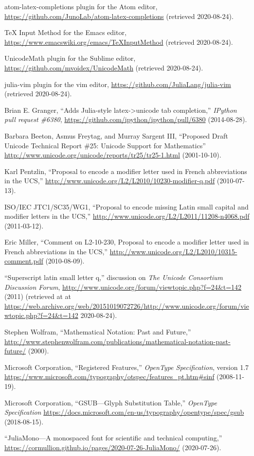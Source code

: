 \documentclass[10pt,english]{article}
\begin{document}
\begin{thebibliography}{10}
atom-latex-completions plugin for the Atom editor,
\url{https://github.com/JunoLab/atom-latex-completions}
(retrieved 2020-08-24).

\TeX{} Input Method for the Emacs editor, \url{https://www.emacswiki.org/emacs/TeXInputMethod}
(retrieved 2020-08-24).

UnicodeMath plugin for the Sublime editor, \url{https://github.com/mvoidex/UnicodeMath}
(retrieved 2020-08-24).

julia-vim plugin for the vim editor, \url{https://github.com/JuliaLang/julia-vim}
(retrieved 2020-08-24).

Brian E. Granger, ``Adds Julia-style
latex->unicode tab completion,'' \textit{IPython pull
request \#6380}, \url{https://github.com/ipython/ipython/pull/6380}
(2014-08-28).

Barbara Beeton, Asmus Freytag, and Murray Sargent
III, ``Proposed Draft Unicode Technical Report \#25:
Unicode Support for Mathematics'' \url{http://www.unicode.org/unicode/reports/tr25/tr25-1.html} (2001-10-10).

Karl Pentzlin, ``Proposal to encode
a modifier letter used in French abbreviations in the UCS,''
\url{http://www.unicode.org/L2/L2010/10230-modifier-q.pdf}
(2010-07-13).

ISO/IEC JTC1/SC35/WG1, ``Proposal
to encode missing Latin small capital and modifier letters in the
UCS,'' \url{http://www.unicode.org/L2/L2011/11208-n4068.pdf}
(2011-03-12).

Eric Miller, ``Comment on L2-10-230,
Proposal to encode a modifier letter used in French abbreviations
in the UCS,'' \url{http://www.unicode.org/L2/L2010/10315-comment.pdf}
(2010-08-09).

``Superscript latin small letter q,''
discussion on \emph{The Unicode Consortium Discussion Forum}, \url{http://www.unicode.org/forum/viewtopic.php?f=24&t=142}
(2011) (retrieved at at \url{https://web.archive.org/web/20151019072726/http://www.unicode.org/forum/viewtopic.php?f=24&t=142}  2020-08-24).

Stephen Wolfram, ``Mathematical
Notation: Past and Future,'' \url{http://www.stephenwolfram.com/publications/mathematical-notation-past-future/}
(2000).

Microsoft Corporation, ``Registered
Features,'' \emph{OpenType Specification}, version
1.7 \url{https://www.microsoft.com/typography/otspec/features_pt.htm\#sinf}
(2008-11-19). 

Microsoft Corporation, ``GSUB---Glyph Substitution Table,'' \textit{OpenType Specification} \url{https://docs.microsoft.com/en-us/typography/opentype/spec/gsub} (2018-08-15).

``JuliaMono---A monospaced font for scientific and technical computing,'' \url{https://cormullion.github.io/pages/2020-07-26-JuliaMono/} (2020-07-26).

\end{thebibliography}
\end{document}

